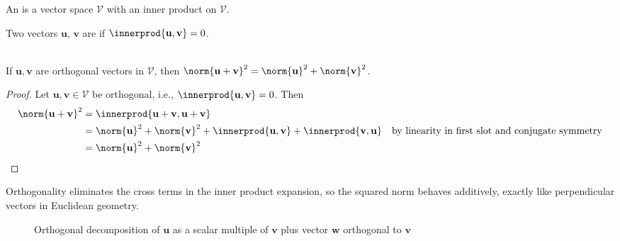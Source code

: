 \begin{definition} An  is a vector space $\mathcal{V}$ with an inner product on $\mathcal{V}$.
\end{definition}

\begin{definition} Two vectors $\mathbf{u}$, $\mathbf{v}$ are  if $\innerprod{\mathbf{u}, \mathbf{v}} = 0$.
\end{definition}

\begin{theorem} \label{thm:pythagorean} \\
If $\mathbf{u}, \mathbf{v}$ are orthogonal vectors in $\mathcal{V}$, then $\norm{\mathbf{u} + \mathbf{v}}^2 = \norm{\mathbf{u}}^2 + \norm{\mathbf{v}}^2$.
\begin{proof} Let $\mathbf{u}, \mathbf{v} \in \mathcal{V}$ be orthogonal, i.e., $\innerprod{\mathbf{u}, \mathbf{v}} = 0$. Then
\begin{align}
\norm{\mathbf{u} + \mathbf{v}}^2 &= \innerprod{\mathbf{u} + \mathbf{v}, \mathbf{u} + \mathbf{v}} \nonumber \\
&= \norm{\mathbf{u}}^2 + \norm{\mathbf{v}}^2 + \innerprod{\mathbf{u}, \mathbf{v}} + \innerprod{\mathbf{v}, \mathbf{u}} \ \ \ \text{by linearity in first slot and conjugate symmetry} \nonumber \\
&= \norm{\mathbf{u}}^2 + \norm{\mathbf{v}}^2 \nonumber
\end{align}
\end{proof}
\end{theorem}

Orthogonality eliminates the cross terms in the inner product expansion, so the squared norm behaves additively, exactly like perpendicular vectors in Euclidean geometry.

\begin{figure}[h]
  \centering
  
  \caption{Orthogonal decomposition of $\mathbf{u}$ as a scalar multiple of $\mathbf{v}$ plus vector $\mathbf{w}$ orthogonal to $\mathbf{v}$}
  \label{fig:orthodecomp}
\end{figure}

